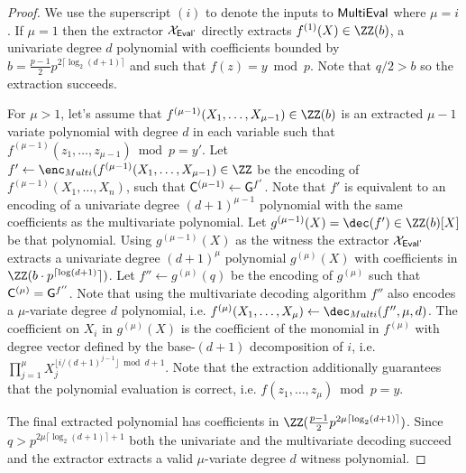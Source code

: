 {\begin{proof}
We use the superscript $(i)$ to denote the inputs to $\textsf{{MultiEval}}$ where $\mu=i$. 
If $\mu=1$ then the extractor $\mathcal{X}_{\textsf{{Eval'}}}$ directly extracts $f^{(1)}(X)\in \ZZ(b)$, a univariate degree $d$ polynomial with coefficients bounded by $b=\frac{p-1}{2}p^{2 \lceil\log_2(d+1)\rceil}$ and such that $f(z)=y \bmod p$. Note that $q/2>b$ so the extraction succeeds.

For $\mu>1$, let's assume that $f^{(\mu-1)}(X_1,\dots,X_{\mu-1})\in \ZZ(b)$ is an extracted $\mu-1$ variate polynomial with degree $d$ in each variable such that $f^{(\mu-1)}(z_1,\dots,z_{\mu-1}) \bmod p=y'$.
Let $f'\gets \enc_{Multi}(f^{(\mu-1)}(X_1,\dots,X_{\mu-1})\in \ZZ$ be the encoding of $f^{(\mu-1)}(X_1,\dots,X_n)$, such that $\gr{C}^{(\mu-1)}\gets \gr{g}^{f'}$. Note that $f'$ is equivalent to an encoding of a univariate degree $(d+1)^{\mu-1}$ polynomial with the same coefficients as the multivariate polynomial. Let $g^{(\mu-1)}(X)=\dec(f')\in \ZZ(b)[X]$ be that polynomial. 
Using $g^{(\mu-1)}(X)$ as the witness the extractor $\mathcal{X}_{\textsf{{Eval'}}}$ extracts a univariate degree $(d+1)^{\mu}$ polynomial $g^{(\mu)}(X)$ with coefficients in $\ZZ(b \cdot p^{\lceil\log(d+1)}\rceil)$. 
Let $f''\gets g^{(\mu)}(q)$ be the encoding of $g^{(\mu)}$ such that $\gr{C}^{(\mu)}=\gr{g}^{f''}$. Note that using the multivariate decoding algorithm $f''$ also encodes a $\mu$-variate degree $d$ polynomial, i.e. $f^{(\mu)}(X_1,\dots,X_\mu)\gets \dec_{Multi}(f'',\mu,d)$. The coefficient on $X_i$ in $g^{(\mu)}(X)$ is the coefficient of the monomial in $f^{(\mu)}$ with degree vector defined by the base-$(d+1)$ decomposition of $i$, i.e. $\prod_{j=1}^\mu  X_j^{\lfloor i/(d+1)^{j-1}\rfloor \bmod d+1 }$. Note that the extraction additionally guarantees that the polynomial evaluation is correct, i.e. $f(z_1,\dots,z_\mu)\bmod p=y$.

The final extracted polynomial has coefficients in $\ZZ(\frac{p-1}{2}p^{2\mu \lceil\log_2(d+1)\rceil})$. Since $q>p^{2\mu\lceil\log_2(d+1)\rceil+1}$ both the univariate and the multivariate decoding succeed and the extractor extracts a valid $\mu$-variate degree $d$ witness polynomial.
\end{proof}
}
